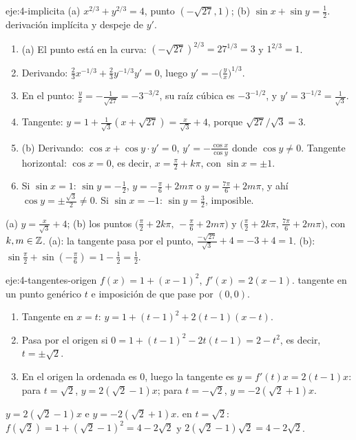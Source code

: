 \begin{solucion}{eje:4-implicita}
\datos (a) $x^{2/3}+y^{2/3}=4$, punto $(-\sqrt{27},1)$; (b) $\sin x+\sin y=\frac12$.
\planteamiento derivación implícita y despeje de $y'$.
\pasos
\begin{enumerate}[label=\arabic*.]
  \item (a) El punto está en la curva: $(-\sqrt{27})^{2/3}=27^{1/3}=3$ y $1^{2/3}=1$.
  \item Derivando: $\frac23x^{-1/3}+\frac23y^{-1/3}y'=0$, luego $y'=-\bigl(\frac yx\bigr)^{1/3}$.
  \item En el punto: $\frac yx=-\frac{1}{\sqrt{27}}=-3^{-3/2}$, su raíz cúbica es $-3^{-1/2}$, y $y'=3^{-1/2}=\frac{1}{\sqrt3}$.
  \item Tangente: $y=1+\frac{1}{\sqrt3}(x+\sqrt{27})=\frac{x}{\sqrt3}+4$, porque $\sqrt{27}/\sqrt3=3$.
  \item (b) Derivando: $\cos x+\cos y\cdot y'=0$, $y'=-\frac{\cos x}{\cos y}$ donde $\cos y\ne0$. Tangente horizontal: $\cos x=0$, es decir, $x=\frac\pi2+k\pi$, con $\sin x=\pm1$.
  \item Si $\sin x=1$: $\sin y=-\frac12$, $y=-\frac\pi6+2m\pi$ o $y=\frac{7\pi}{6}+2m\pi$, y ahí $\cos y=\pm\frac{\sqrt3}{2}\ne0$. Si $\sin x=-1$: $\sin y=\frac32$, imposible.
\end{enumerate}
\resultado (a) $y=\frac{x}{\sqrt3}+4$; (b) los puntos $\bigl(\frac\pi2+2k\pi,\,-\frac\pi6+2m\pi\bigr)$ y $\bigl(\frac\pi2+2k\pi,\,\frac{7\pi}{6}+2m\pi\bigr)$, con $k,m\in\mathbb{Z}$.
\comprobacion (a): la tangente pasa por el punto, $\frac{-\sqrt{27}}{\sqrt3}+4=-3+4=1$. (b): $\sin\frac\pi2+\sin(-\frac\pi6)=1-\frac12=\frac12$.
\end{solucion}

\begin{solucion}{eje:4-tangentes-origen}
\datos $f(x)=1+(x-1)^{2}$, $f'(x)=2(x-1)$.
\planteamiento tangente en un punto genérico $t$ e imposición de que pase por $(0,0)$.
\pasos
\begin{enumerate}[label=\arabic*.]
  \item Tangente en $x=t$: $y=1+(t-1)^{2}+2(t-1)(x-t)$.
  \item Pasa por el origen si $0=1+(t-1)^{2}-2t(t-1)=2-t^{2}$, es decir, $t=\pm\sqrt2$.
  \item En el origen la ordenada es $0$, luego la tangente es $y=f'(t)x=2(t-1)x$: para $t=\sqrt2$, $y=2(\sqrt2-1)x$; para $t=-\sqrt2$, $y=-2(\sqrt2+1)x$.
\end{enumerate}
\resultado $y=2(\sqrt2-1)x$ e $y=-2(\sqrt2+1)x$.
\comprobacion en $t=\sqrt2$: $f(\sqrt2)=1+(\sqrt2-1)^{2}=4-2\sqrt2$ y $2(\sqrt2-1)\sqrt2=4-2\sqrt2$.
\end{solucion}

